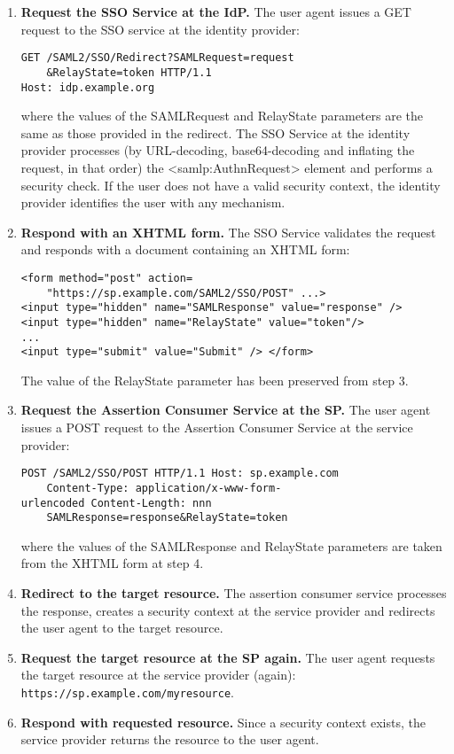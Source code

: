 \documentclass[a4paper, 10pt, titlepage]{article}
\begin{document}
\begin{enumerate}
\item \textbf{Request the SSO Service at the IdP.} The user agent issues a GET request to the SSO service at the identity provider:
\begin{lstlisting}
GET /SAML2/SSO/Redirect?SAMLRequest=request
	&RelayState=token HTTP/1.1
Host: idp.example.org
\end{lstlisting}
where the values of the SAMLRequest and RelayState parameters are the same as those provided in the redirect. The SSO Service at the identity provider processes (by URL-decoding, base64-decoding and inflating the request, in that order) the <samlp:AuthnRequest> element and performs a security check. If the user does not have a valid security context, the identity provider identifies the user with any mechanism.
\item \textbf{Respond with an XHTML form.} The SSO Service validates the request and responds with a document containing an XHTML form:
\begin{lstlisting}
<form method="post" action=
	"https://sp.example.com/SAML2/SSO/POST" ...> 
<input type="hidden" name="SAMLResponse" value="response" /> 
<input type="hidden" name="RelayState" value="token"/> 
... 
<input type="submit" value="Submit" /> </form>
\end{lstlisting}
The value of the RelayState parameter has been preserved from step 3.
\item \textbf{Request the Assertion Consumer Service at the SP.} The user agent issues a POST request to the Assertion Consumer Service at the service provider:
\begin{lstlisting}
POST /SAML2/SSO/POST HTTP/1.1 Host: sp.example.com 
	Content-Type: application/x-www-form-
urlencoded Content-Length: nnn 
	SAMLResponse=response&RelayState=token
\end{lstlisting}
where the values of the SAMLResponse and RelayState parameters are taken from the XHTML form at step 4.
\item \textbf{Redirect to the target resource.} The assertion consumer service processes the response, creates a security context at the service provider and redirects the user agent to the target resource.
\item \textbf{Request the target resource at the SP again.} The user agent requests the target resource at the service provider (again): \lstinline|https://sp.example.com/myresource|.
\item \textbf{Respond with requested resource.} Since a security context exists, the service provider returns the resource to the user agent.
\end{enumerate}
\end{document}

